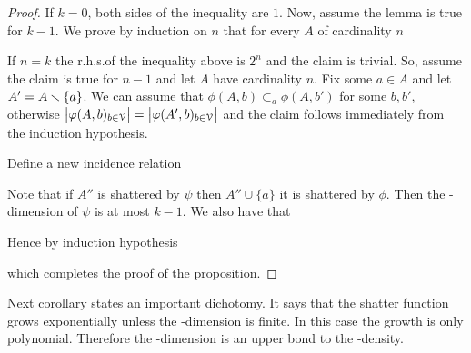\documentclass[sputnik.tex]{subfiles}
\begin{document}
\begin{proof}
If $k=0$, both sides of the inequality are $1$.
Now, assume the lemma is true for $k-1$.
We prove by induction on $n$ that for every $A$ of cardinality $n$


If $n=k$ the r.h.s.\@ of the inequality above is $2^n$ and the claim is trivial.
So, assume the claim is true for $n-1$ and let $A$ have cardinality $n$.
Fix some $a\in A$ and let $A'=A\smallsetminus\{a\}$.
We can assume that $\phi(A,b)\subset_a\phi(A,b')$ for some $b,b'$, otherwise $\big|\varphi(A,b)_{b\in\EuScript V}\big|=\big|\varphi(A',b)_{b\in\EuScript V}\big|$ and the claim follows immediately from the induction hypothesis.

Define a new incidence relation



Note that if $A''$ is shattered by $\psi$ then $A''\cup\{a\}$ it is shattered by $\phi$.
Then the \vc-dimension of $\psi$ is at most $k-1$.
We also have that


Hence by induction hypothesis





which completes the proof of the proposition.
\end{proof}

Next corollary states an important dichotomy.
It says that the shatter function grows exponentially unless the \vc-dimension is finite.
In this case the growth is only polynomial.
Therefore the \vc-dimension is an upper bond to the \vc-density.
\end{document}
